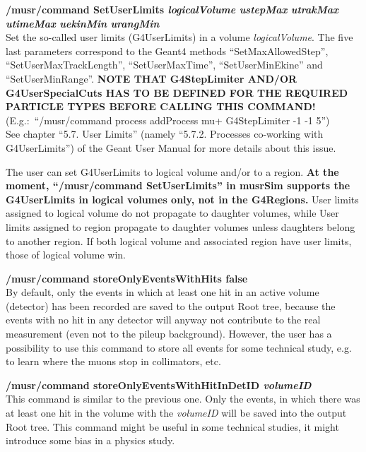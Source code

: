 \documentclass[twoside]{dis04}
\begin{document}
\begin{description}
\item{\bf /musr/command SetUserLimits \emph{logicalVolume} \emph{ustepMax} \emph{utrakMax} \emph{utimeMax} \emph{uekinMin} \emph{urangMin}}\\
	Set the so-called user limits (G4UserLimits) in a volume  \emph{logicalVolume}.
	The five last parameters correspond to the Geant4 methods
	``SetMaxAllowedStep'', ``SetUserMaxTrackLength'', ``SetUserMaxTime'',
	``SetUserMinEkine'' and ``SetUserMinRange''.
	{\bf NOTE THAT  G4StepLimiter AND/OR G4UserSpecialCuts HAS TO BE DEFINED FOR THE
	REQUIRED PARTICLE TYPES BEFORE CALLING THIS COMMAND!}\\
	(E.g.:\ ``/musr/command process addProcess        mu+   G4StepLimiter      -1 -1 5'')\\
	See chapter ``5.7.  User Limits'' (namely ``5.7.2.  Processes co-working with G4UserLimits'')
	of the Geant User Manual for more details about this issue.

	The user can set G4UserLimits to logical volume and/or to a region.
	{\bf At the moment, ``/musr/command SetUserLimits'' in musrSim supports the G4UserLimits
	in logical volumes only, not in the G4Regions.}
	User limits assigned to logical volume do not propagate to daughter volumes, 
	while User limits assigned to region propagate to daughter volumes unless 
	daughters belong to another region. If both logical volume and associated 
	region have user limits, those of logical volume win.


\item{\bf /musr/command storeOnlyEventsWithHits false}\\
	By default, only the events in which at least one hit in an active
	volume (detector) has been recorded are saved to the output Root tree,
	because the events with no hit in any detector will anyway not contribute
	to the real measurement (even not to the pileup background).
	However, the user has a possibility to use this command
	to store all events for some technical study, e.g. to learn where
	the muons stop in collimators, etc.

\item{\bf /musr/command storeOnlyEventsWithHitInDetID \emph{volumeID}}\\
	This command is similar to the previous one.  Only the events,
	in which there was at least one hit in the volume with the
	\emph{volumeID} will be saved into the output Root tree.
	This command might be useful in some technical studies, it might
	introduce some bias in a physics study.


\end{description}
\end{document}
